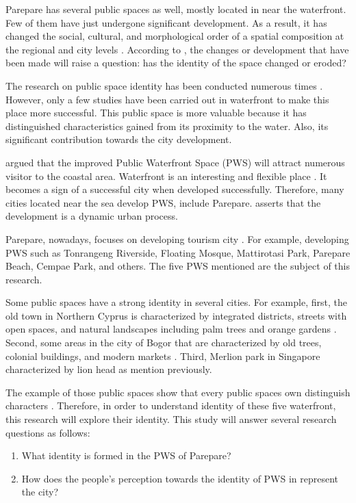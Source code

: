 \documentclass[draft, ../riset_senja.tex]{subfiles}
\begin{document}
Parepare has several public spaces as well, mostly located in near the waterfront. Few of them have just undergone significant development. As a result, it has changed the social, cultural, and morphological order of a spatial composition at the regional and city levels \citep{oktay2002, kaymaz2013}.
According to \citep{Kaymaz13}, the changes or development that have been made will raise a question: has the identity of the space changed or eroded?

The research on public space identity has been conducted numerous times \citep{oktay2015}. However, only a few studies have been carried out in waterfront to make this place more successful.
This public space is more valuable because it has distinguished characteristics gained from its proximity to the water. Also, its significant contribution towards the city development.

\cite{hussein2014} argued that the improved Public Waterfront Space (PWS) will attract numerous visitor to the coastal area.
Waterfront is an interesting and flexible place \citep{hussein2014}. It becomes a sign of a successful city when developed successfully.
Therefore, many cities located near the sea develop PWS, include Parepare. \cite{oktay2002} asserts that the development is a dynamic urban process.

Parepare, nowadays, focuses on developing tourism city \citep{faniapriani2018}.
For example, developing PWS such as Tonrangeng Riverside, Floating Mosque, Mattirotasi Park, Parepare Beach, Cempae Park, and others. The five PWS mentioned are the subject of this research.

Some public spaces have a strong identity in several cities.
For example, first, the old town in Northern Cyprus is characterized by integrated districts, streets with open spaces, and natural landscapes including palm trees and orange gardens \citep{oktay2002}.
Second, some areas in the city of Bogor that are characterized by old trees, colonial buildings, and modern markets \citep{hartanti2014}. Third, Merlion park in Singapore characterized by lion head as mention previously.

The example of those public spaces show that every public spaces own distinguish characters \citep{ahmadi2009}.
Therefore, in order to understand identity of these five waterfront, this research will explore their identity.
This study will answer several research questions as follows:

\begin{enumerate}
	\item What identity is formed in the PWS of Parepare?
	\item How does the people's perception towards the identity of PWS in represent the city?
\end{enumerate}
\end{document}
